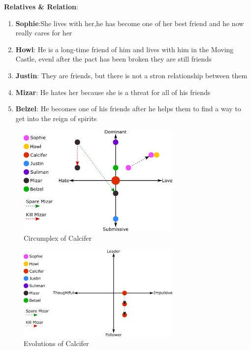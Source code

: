 \textbf{Relatives \& Relation}:
\begin{enumerate}
\item \textbf{Sophie}:She lives with her,he has become one of her best friend and he now really cares for her
\item \textbf{Howl}: He is a long-time friend of him and lives with him in the Moving Castle, evenl after the pact has been broken they are still friends
\item \textbf{Justin}: They are friends, but there is not a stron relationship between them
\item \textbf{Mizar}: He hates her because she is a threat for all of his friends
\item \textbf{Belzel}: He becomes one of his friends after he helps them to find a way to get into the reign of spirits
\end{enumerate}

\begin{figure}
  \centering
  \includegraphics[width=8cm]{Images/Circumplexes/calciferCircumplex}
  \caption{Circumplex of Calcifer}
\end{figure}

\begin{figure}
  \centering
   \includegraphics[width=8cm]{Images/Evolutions/calciferEvolution}
  \caption{Evolutions of Calcifer}
\end{figure}

